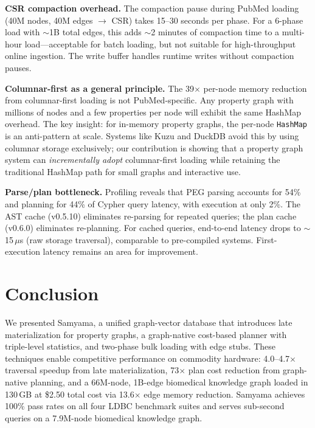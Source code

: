 \documentclass[sigconf, nonacm]{acmart}
\begin{document}
\textbf{CSR compaction overhead.}
The compaction pause during PubMed loading (40M nodes, 40M edges $\rightarrow$ CSR) takes 15--30 seconds per phase.
For a 6-phase load with ${\sim}$1B total edges, this adds ${\sim}$2 minutes of compaction time to a multi-hour load---acceptable for batch loading, but not suitable for high-throughput online ingestion.
The write buffer handles runtime writes without compaction pauses.

\textbf{Columnar-first as a general principle.}
The 39$\times$ per-node memory reduction from columnar-first loading is not PubMed-specific.
Any property graph with millions of nodes and a few properties per node will exhibit the same HashMap overhead.
The key insight: for in-memory property graphs, the per-node \texttt{HashMap} is an anti-pattern at scale.
Systems like Kuzu and DuckDB avoid this by using columnar storage exclusively;
our contribution is showing that a property graph system can \emph{incrementally adopt} columnar-first loading
while retaining the traditional HashMap path for small graphs and interactive use.

\textbf{Parse/plan bottleneck.}
Profiling reveals that PEG parsing accounts for 54\% and planning for 44\% of Cypher query latency, with execution at only 2\%.
The AST cache (v0.5.10) eliminates re-parsing for repeated queries; the plan cache (v0.6.0) eliminates re-planning.
For cached queries, end-to-end latency drops to ${\sim}$15\,$\mu$s (raw storage traversal), comparable to pre-compiled systems.
First-execution latency remains an area for improvement.

\section{Conclusion}
\label{sec:conclusion}

We presented Samyama, a unified graph-vector database that introduces late materialization for property graphs, a graph-native cost-based planner with triple-level statistics, and two-phase bulk loading with edge stubs.
These techniques enable competitive performance on commodity hardware: 4.0--4.7$\times$ traversal speedup from late materialization, 73$\times$ plan cost reduction from graph-native planning, and a 66M-node, 1B-edge biomedical knowledge graph loaded in 130\,GB at \$2.50 total cost via 13.6$\times$ edge memory reduction.
Samyama achieves 100\% pass rates on all four LDBC benchmark suites and serves sub-second queries on a 7.9M-node biomedical knowledge graph.
\end{document}
